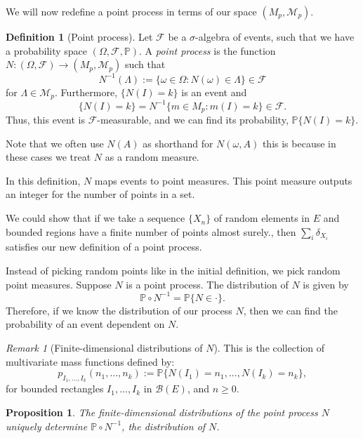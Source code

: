 \documentclass[11pt, oneside]{article}   	%
\newtheorem{proposition}{Proposition}[section]
\theoremstyle{definition}
\newtheorem{definition}{Definition}[section]
\theoremstyle{remark}
\newtheorem*{remark}{Remark}
\begin{document}
We will now redefine a point process in terms of our space $(M_p,\mathcal{M}_p)$.

\begin{definition}[Point process]
  Let $\mathcal{F}$ be a $\sigma$-algebra of events, such that we have a probability space $(\Omega, \mathcal{F}, \mathbb{P})$. A \textit{point process} is the function $N : (\Omega,\mathcal{F}) \to (M_p, \mathcal{M}_p)$ such that
  $$N^{-1}(\Lambda):=\{\omega \in \Omega : N(\omega) \in \Lambda\} \in \mathcal{F}$$
  for $\Lambda \in \mathcal{M}_p$. 
  Furthermore, $\{N(I)=k\}$ is an event and
  $$\{N(I)=k\}=N^{-1}\{m \in M_p :m(I) = k\} \in \mathcal{F}.$$
  Thus, this event is $\mathcal{F}$-measurable, and we can find its probability, $\mathbb{P}\{ N(I)=k \}$.
\end{definition}

Note that we often use $N(A)$ as shorthand for $N(\omega, A)$ this is because in these cases we treat $N$ as a random measure.

In this definition, $N$ maps events to point measures. This point measure outputs an integer for the number of points in a set.

We could show that if we take a sequence $\{X_n\}$ of random elements in $E$ and bounded regions have a finite number of points almost surely., then $\sum_{i} \delta_{X_i}$ satisfies our new definition of a point process.

Instead of picking random points like in the initial definition, we pick random point measures.
Suppose $N$ is a point process. The distribution of $N$ is given by 
$$\mathbb{P} \circ N^{-1} = \mathbb{P}\{ N \in \cdot \}. $$
Therefore, if we know the distribution of our process $N$, then we can find the probability of an event dependent on $N$.

\begin{remark}[Finite-dimensional distributions of $N$]
  This is the collection of multivariate mass functions defined by:
  $$p_{I_1,...,I_k}(n_1,...,n_k) := \mathbb{P}\{ N(I_1)=n_1,...,N(I_k)=n_k \},$$
  for bounded rectangles $I_1,...,I_k$ in $\mathcal{B}(E)$, and $n \geq 0$.
\end{remark}

\begin{proposition} \label{unique laplace}
  The finite-dimensional distributions of the point process $N$ uniquely determine $\mathbb{P} \circ N^{-1}$, the distribution of $N$.
\end{proposition}
\end{document}
